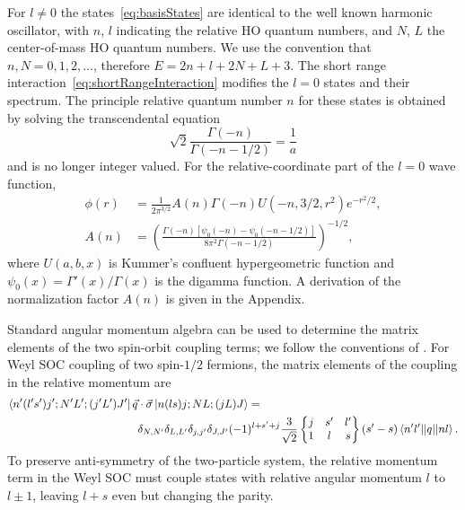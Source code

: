 \documentclass[%
 notitlepage,
 preprint,
showpacs,%
 amsmath,amssymb,
 aps,
pra,
]{revtex4-1}
\newcommand{\sixj}[6]{ \begin{Bmatrix}
  #1 & #2 & #3 \\
  #4 & #5 & #6 
 \end{Bmatrix}}
\begin{document}
For $l\neq0$ the states~\eqref{eq:basisStates} are identical to the well known harmonic oscillator, with $n$, $l$ indicating the relative HO quantum numbers, and $N$, $L$ the center-of-mass HO quantum numbers. We use the convention that $n,N=0,1,2,\dots$, therefore $E=2n+l+2N+L+3$. The short range interaction~\eqref{eq:shortRangeInteraction} modifies the $l=0$ states and their spectrum. The principle relative quantum number $n$ for these states is obtained by solving the transcendental equation
\begin{equation}\label{eq:eigenvalueEqn}
\sqrt{2}\frac{\Gamma(-n)}{\Gamma(-n-1/2)}=\frac{1}{a}
\end{equation}
and is no longer integer valued. For the relative-coordinate part of the $l=0$ wave function,
\begin{align}
\phi(r)&=\frac{1}{2\pi^{3/2}}A(n)\Gamma(-n)U(-n,3/2,r^2)e^{-r^2/2}, \label{eq:BuschWF}\\
A(n)&=\left(\frac{\Gamma(-n)[\psi_0(-n)-\psi_0(-n-1/2)]}{8 \pi^2 \Gamma(-n-1/2)}\right)^{-1/2},
\end{align}
where $U(a,b,x)$ is Kummer's confluent hypergeometric function and $\psi_0(x)=\Gamma'(x)/\Gamma(x)$ is the digamma function. A derivation of the normalization factor $A(n)$ is given in the Appendix.

Standard angular momentum algebra can be used to determine the matrix elements of the two spin-orbit coupling terms; we follow the conventions of \cite{Edmonds}. For Weyl SOC coupling of two spin-$1/2$ fermions, the matrix elements of the coupling in the relative momentum are
\begin{equation}\label{eq:WeylRel}\begin{split}
\bra{n'(l's')j';N'L';(j'L')J'}\vec{q}&\cdot\vec{\sigma} \ket{n(ls)j;NL;(jL)J} = \\
&\delta_{N,N'}\delta_{L,L'}\delta_{j,j'}\delta_{J,J'}(-1)^{l+s'+j}\frac{3}{\sqrt{2}}\sixj{j}{s'}{l'}{1}{l}{s} (s'-s)\braket{n'l' || q || n l}.
\end{split}
\end{equation}
To preserve anti-symmetry of the two-particle system, the relative momentum term in the Weyl SOC must couple states with relative angular momentum $l$ to $l\pm 1$, leaving $l+s$ even but changing the parity.
\end{document}
